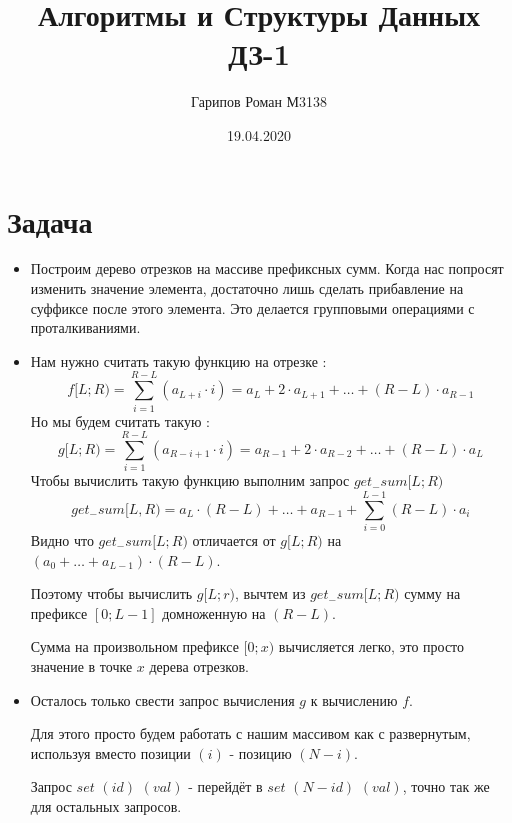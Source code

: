 \documentclass{article}
\title{Алгоритмы и Структуры Данных ДЗ-1}
\date{19.04.2020}
\author{Гарипов Роман М3138}
\begin{document}
  \maketitle

\section*{Задача }

\begin{itemize}
\item Построим дерево отрезков на массиве префиксных сумм. Когда нас попросят изменить значение элемента, достаточно лишь сделать прибавление на суффиксе после этого элемента. Это делается групповыми операциями с проталкиваниями.
\item Нам нужно считать такую функцию на отрезке : 
\begin{equation}
f[L;R) = \sum_{i = 1}^{R - L}(a_{L + i} \cdot i) = a_L + 2 \cdot a_{L + 1} + \ldots + (R - L) \cdot a_{R - 1}
\end{equation}
Но мы будем считать такую :
\begin{equation}
g[L;R) = \sum_{i = 1}^{R - L}(a_{R - i + 1} \cdot i) = a_{R - 1} + 2 \cdot a_{R - 2} + \ldots + (R - L) \cdot a_L
\end{equation}
Чтобы вычислить такую функцию выполним запрос $get_-sum[L;R)$
 $$get_-sum[L, R) = a_L \cdot (R - L) + \ldots + a_{R - 1} + \sum_{i = 0}^{L - 1}(R - L)\cdot a_i$$
Видно что $get_-sum[L;R)$ отличается от $g[L;R)$ на $(a_0 + \ldots + a_{L - 1}) \cdot (R - L)$. 

Поэтому чтобы вычислить $g[L;r)$, вычтем из $get_-sum[L;R)$ сумму на префиксе $[0;L - 1]$ домноженную на $(R - L)$.

Сумма на произвольном префиксе $[0;x)$ вычисляется легко, это просто значение в точке $x$ дерева отрезков.
\item Осталось только свести запрос вычисления $g$ к вычислению $f$.

Для этого просто будем работать с нашим массивом как с развернутым, используя вместо позиции $(i)$ - позицию $(N - i)$.


Запрос $set$ $(id)$ $(val)$ - перейдёт в $set$ $(N - id)$ $(val)$, точно так же для остальных запросов.
\end{itemize}
\end{document}
